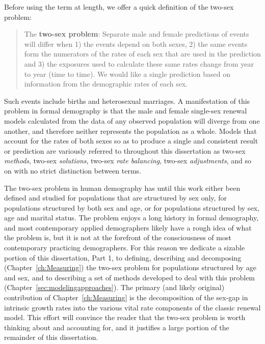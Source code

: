 Before using the term at length, we offer a quick definition of the two-sex
problem:

\begin{singlespace}
\begin{quote}
The \textbf{two-sex problem}: Separate male and female predictions of events
will differ when 1) the events depend on both sexes, 2) the same events 
form the numerators of the rates of each sex that are used in the prediction and
3) the exposures used to calculate these same rates change from year to year
(time to time). We would like a single prediction based on information from the
demographic rates of each sex.
\end{quote}
\end{singlespace}

 Such events include births and heterosexual marriages.
 A manifestation of this problem in formal demography is that the male
 and female single-sex renewal models calculated from the data of any observed 
 population will diverge from one another, and therefore neither represents
 the population as a whole. Models that account for the rates of both sexes
 so as to produce a single and consistent result or prediction are
 variously referred to throughout this dissertation as two-sex \textit{methods},
 two-sex \textit{solutions}, two-sex \textit{rate balancing}, two-sex 
 \textit{adjustments}, and so on with no strict distinction between terms.
 
 The two-sex problem in human demography has until this work either been defined 
 and studied for populations that are structured by sex only, for populations
structured by both sex and age, or for populations structured by sex, age and
marital status. The problem enjoys a long history in formal demography, and most
contemporary applied demographers likely have a rough idea of what the problem
is, but it is not at the forefront of the consciousness of most contemporary
practicing demographers. For this reason we dedicate a sizable portion of 
this dissertation, Part 1, to defining, describing
and decomposing (Chapter~\ref{ch:Measuring}) the two-sex problem for populations
structured by age and sex, and to describing a set of methods developed to deal
with this problem (Chapter~\ref{sec:modelingapproaches}). The primary (and likely
original) contribution of Chapter~\ref{ch:Measuring} is the decomposition of the 
sex-gap in intrinsic growth rates into the various vital rate components of the 
classic renewal model. This effort will convince the reader that the two-sex
problem is worth thinking about and accounting for, and it justifies a large
portion of the remainder of this dissertation.

